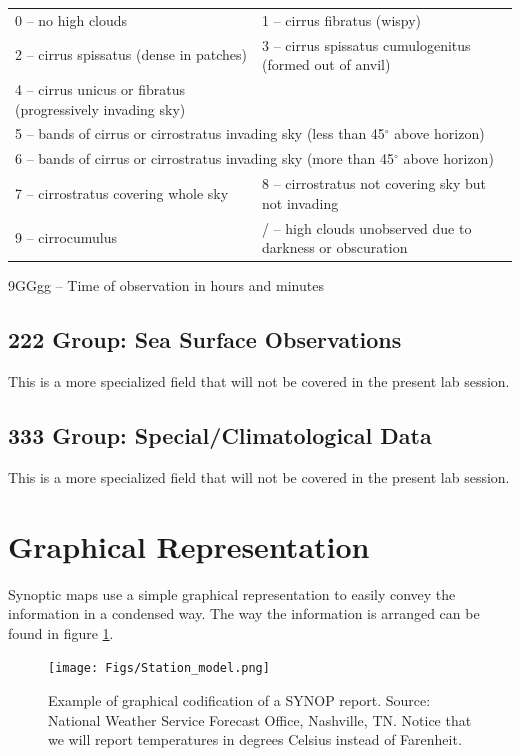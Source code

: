 \documentclass{article}
\begin{document}
\begin{description}
\begin{description}
        \begin{tabular}{ll}
          0 -- no high clouds&1 -- cirrus fibratus (wispy)\\
          2 -- cirrus spissatus (dense in patches)&3 -- cirrus spissatus cumulogenitus (formed out of anvil)\\
          4 -- cirrus unicus or fibratus (progressively invading sky) &\\
          \multicolumn{2}{l}{5 -- bands of cirrus or cirrostratus invading sky (less than 45$^\circ$ above horizon)}\\
          \multicolumn{2}{l}{6 -- bands of cirrus or cirrostratus invading sky (more than 45$^\circ$ above horizon)}\\
          7 -- cirrostratus covering whole sky&8 -- cirrostratus not covering sky but not invading\\
          9 -- cirrocumulus &/ -- high clouds unobserved due to darkness or obscuration \\
      \end{tabular}
\end{description}
\end{description}

9GGgg -- Time of observation in hours and minutes

\subsection{222 Group:  Sea Surface Observations}

This is a more specialized field that will not be covered in the present lab session.

\subsection{333 Group:  Special/Climatological Data}

This is a more specialized field that will not be covered in the present lab session.


\section{Graphical Representation}

Synoptic maps use a simple graphical representation to easily convey the information in a condensed way. The way the information is arranged can be found in figure \ref{fig_synop_scheme}.

\begin{figure}[h]
\begin{center}
\texttt{[image: Figs/Station\_model.png]}
\caption{Example of graphical codification of a SYNOP report. Source: National Weather Service Forecast Office, Nashville, TN. Notice that we will report temperatures in degrees Celsius instead of Farenheit.}\label{fig_synop_scheme}
\end{center}
\end{figure}
\end{document}
